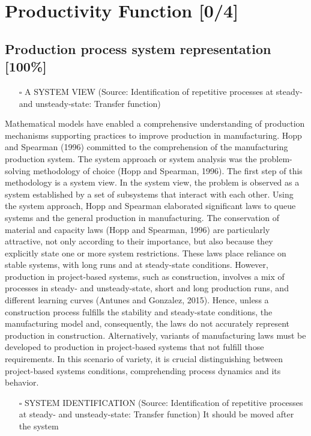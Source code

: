 \documentclass{article}
\begin{document}
\section{Productivity Function [0/4]}
\label{sec:orgee58b16}
\subsection{Production process system representation [100\%]}
\label{sec:orgcc612b1}

\begin{itemize}
\item[{$\square$}] A SYSTEM VIEW (Source: Identification of repetitive processes at steady- and unsteady-state: Transfer function)
\end{itemize}

Mathematical models have enabled a comprehensive understanding of production mechanisms supporting practices to improve production in manufacturing.
Hopp and Spearman (1996) committed to the comprehension of the manufacturing production system.
The system approach or system analysis was the problem-solving methodology of choice (Hopp and Spearman, 1996).
The first step of this methodology is a system view.
In the system view, the problem is observed as a system established by a set of subsystems that interact with each other.
Using the system approach, Hopp and Spearman elaborated significant laws to queue systems and the general production in manufacturing.
The conservation of material and capacity laws (Hopp and Spearman, 1996) are particularly attractive, not only according to their importance, but also because they explicitly state one or more system restrictions.
These laws place reliance on stable systems, with long runs and at steady-state conditions. However, production in project-based systems, such as construction, involves a mix of processes in steady- and unsteady-state, short and long production runs, and different learning curves (Antunes and Gonzalez, 2015).
Hence, unless a construction process fulfills the stability and steady-state conditions, the manufacturing model and, consequently, the laws do not accurately represent production in construction. Alternatively, variants of manufacturing laws must be developed to production in project-based systems that not fulfill those requirements.
In this scenario of variety, it is crucial distinguishing between project-based systems conditions, comprehending process dynamics and its behavior.


\begin{itemize}
\item[{$\square$}] SYSTEM IDENTIFICATION (Source: Identification of repetitive processes at steady- and unsteady-state: Transfer function)
It should be moved after the system
\end{itemize}
\end{document}
